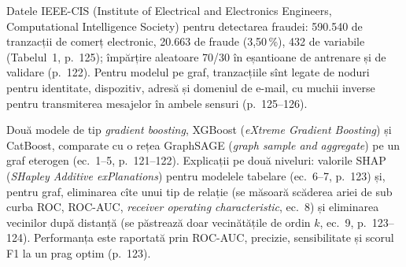 \textbf{} %
{Datele IEEE-CIS (Institute of Electrical and Electronics Engineers, Computational Intelligence Society) pentru detectarea fraudei: 590.540 de tranzacții de comerț electronic, 20.663 de fraude (3,50\,\%), 432 de variabile (Tabelul~1, p.~125); împărțire aleatoare 70/30 în eșantioane de antrenare și de validare (p.~122).
Pentru modelul pe graf, tranzacțiile sînt legate de noduri pentru identitate, dispozitiv, adresă și domeniul de e-mail, cu muchii inverse pentru transmiterea mesajelor în ambele sensuri (p.~125--126).}

\textbf{} %
{Două modele de tip \emph{gradient boosting}, XGBoost (\emph{eXtreme Gradient Boosting}) și CatBoost, comparate cu o rețea GraphSAGE (\emph{graph sample and aggregate}) pe un graf eterogen (ec.~1--5, p.~121--122).
Explicații pe două niveluri: valorile SHAP (\emph{SHapley Additive exPlanations}) pentru modelele tabelare (ec.~6--7, p.~123) și, pentru graf, eliminarea cîte unui tip de relație (se măsoară scăderea ariei de sub curba ROC, ROC-AUC, \emph{receiver operating characteristic}, ec.~8) și eliminarea vecinilor după distanță (se păstrează doar vecinătățile de ordin $k$, ec.~9, p.~123--124).
Performanța este raportată prin ROC-AUC, precizie, sensibilitate și scorul F1 la un prag optim (p.~123).}

